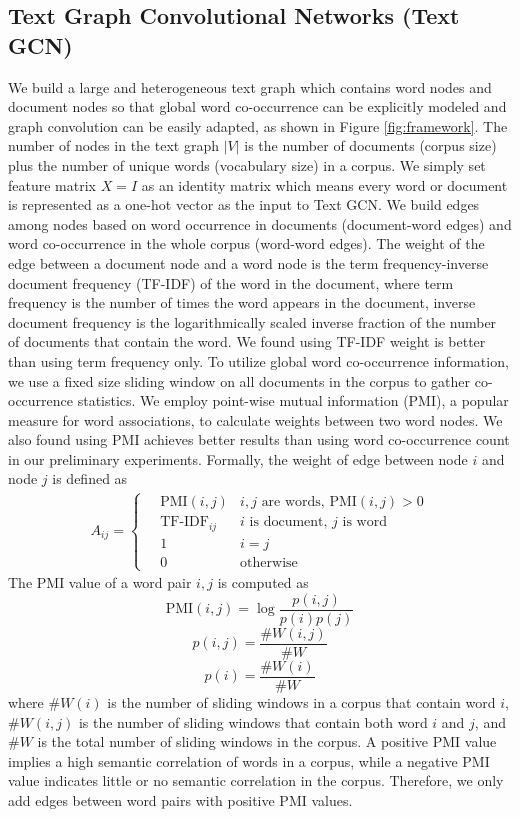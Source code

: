 \documentclass[letterpaper]{article} \usepackage{aaai19}  \usepackage{times}  \usepackage{helvet}  \usepackage{courier}  \usepackage{url}  \usepackage{graphicx}  \frenchspacing  \usepackage{amsmath}
\begin{document}
\subsection{Text Graph Convolutional Networks (Text GCN)}
We build a large and heterogeneous text graph which contains word nodes and document nodes so that global word co-occurrence can be explicitly modeled and graph convolution can be easily adapted, as shown in Figure \ref{fig:framework}. The number of nodes in the text graph $|V|$ is the number of documents (corpus size) plus the number of unique words (vocabulary size) in a corpus. We simply set feature matrix $X = I$ as an identity matrix which means every word or document is represented as a one-hot vector as the input to Text GCN. We build edges among nodes based on word occurrence in documents (document-word edges) and word co-occurrence in the whole corpus (word-word edges).
The weight of the edge between a document node and a word node is the term frequency-inverse document frequency (TF-IDF) of the word in the document, where term frequency is the number of times the word appears in the document, inverse document frequency is the logarithmically scaled inverse fraction of the number of documents that contain the word. We found using TF-IDF weight is better than using term frequency only. To utilize global word co-occurrence information, we use a fixed size sliding window on all documents in the corpus to gather co-occurrence statistics. We employ point-wise mutual information (PMI), a popular measure for word associations, to calculate weights between two word nodes. We also found using PMI achieves better results than using word co-occurrence count in our preliminary experiments. Formally, the weight of edge between node $i$ and node $j$ is defined as
\begin{align}
A_{ij} = 
\begin{cases}
\quad\text{PMI}(i, j)& i,j \text{ are words, } \text{PMI}(i, j) > 0\\
\quad \text{TF-IDF}_{ij}& i \text{ is document, } j \text{ is word }\\
\quad 1 & i = j \\
\quad 0&  \text{otherwise}
\end{cases}
\end{align}
The PMI value of a word pair $i, j$ is computed as
\begin{equation}
\text{PMI}(i, j) = \log \frac{p(i, j)}{p(i)p(j)}
\end{equation}
\begin{equation}
p(i, j) = \frac{\#W(i, j)}{\#W}
\end{equation}
\begin{equation}
p(i) = \frac{\#W(i)}{\#W}
\end{equation}
where $\#W(i)$ is the number of sliding windows in a corpus that contain word $i$, $\#W(i, j)$ is the number of sliding windows that contain both word $i$ and $j$, and $\#W$ is the total number of sliding windows in the corpus. A positive PMI value implies a high semantic correlation of words in a corpus, while a negative PMI value indicates little or no semantic correlation in the corpus. Therefore, we only add edges between word pairs with positive PMI values.
\end{document}
